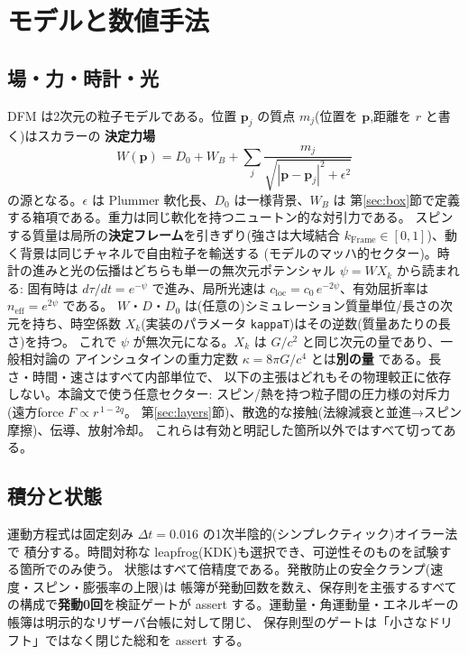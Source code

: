\documentclass[a4paper,10pt,twocolumn]{ltjsarticle}
\begin{document}
\section{モデルと数値手法}
\label{sec:methods}

\subsection{場・力・時計・光}

DFM は2次元の粒子モデルである。位置 $\bm p_j$ の質点 $m_j$(位置を $\bm p$,距離を $r$ と書く)はスカラーの
\textbf{決定力場}
\begin{equation}
  W(\bm p)=D_0+W_B+\sum_j \frac{m_j}{\sqrt{|\bm p-\bm p_j|^2+\epsilon^2}}
  \label{eq:W}
\end{equation}
の源となる。$\epsilon$ は Plummer 軟化長、$D_0$ は一様背景、$W_B$ は
第\ref{sec:box}節で定義する箱項である。重力は同じ軟化を持つニュートン的な対引力である。
スピンする質量は局所の\textbf{決定フレーム}を引きずり(強さは大域結合
$k_{\mathrm{Frame}}\in[0,1]$)、動く背景は同じチャネルで自由粒子を輸送する
(モデルのマッハ的セクター)。時計の進みと光の伝播はどちらも単一の無次元ポテンシャル
$\psi=W X_k$ から読まれる: 固有時は $d\tau/dt=e^{-\psi}$ で進み、局所光速は
$c_{\mathrm{loc}}=c_0\,e^{-2\psi}$、有効屈折率は $n_{\mathrm{eff}}=e^{2\psi}$ である。
$W$・$D$・$D_0$ は(任意の)シミュレーション質量単位/長さの次元を持ち、時空係数
$X_k$(実装のパラメータ \texttt{kappaT})はその逆数(質量あたりの長さ)を持つ。
これで $\psi$ が無次元になる。$X_k$ は $G/c^2$ と同じ次元の量であり、一般相対論の
アインシュタインの重力定数 $\kappa=8\pi G/c^4$ とは\textbf{別の量}
である。長さ・時間・速さはすべて内部単位で、
以下の主張はどれもその物理較正に依存しない。本論文で使う任意セクター:
スピン/熱を持つ粒子間の圧力様の対斥力(遠方force $F\propto r^{\,1-2q}$。
第\ref{sec:layers}節)、散逸的な接触(法線減衰と並進→スピン摩擦)、伝導、放射冷却。
これらは有効と明記した箇所以外ではすべて切ってある。

\subsection{積分と状態}

運動方程式は固定刻み $\Delta t=0.016$ の1次半陰的(シンプレクティック)オイラー法で
積分する。時間対称な leapfrog(KDK)も選択でき、可逆性そのものを試験する箇所でのみ使う。
状態はすべて倍精度である。発散防止の安全クランプ(速度・スピン・膨張率の上限)は
帳簿が発動回数を数え、保存則を主張するすべての構成で\textbf{発動0回}を検証ゲートが
assert する。運動量・角運動量・エネルギーの帳簿は明示的なリザーバ台帳に対して閉じ、
保存則型のゲートは「小さなドリフト」ではなく閉じた総和を assert する。
\end{document}
